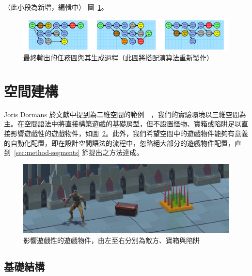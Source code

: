 （此小段為新增，編輯中）
圖~\ref{fig:final-mission-graph}。

\begin{figure}[!htb]
  \begin{center}
    \includegraphics[width=1.0\textwidth]{figures/final-mission-graph.png}
    \caption{最終輸出的任務圖與其生成過程（此圖將搭配演算法重新製作）}
    \label{fig:final-mission-graph}
  \end{center}
\end{figure}

\clearpage

\section{空間建構}
\label{sec:method-spacepieces}

Joris Dormans 於文獻中提到為二維空間的範例~\cite{dormans2010adventures}~\cite{dormans2012engineering}，我們的實驗環境以三維空間為主。在空間語法中將直接構築遊戲的基礎房型，但不設置怪物、寶箱或陷阱足以直接影響遊戲性的遊戲物件，如圖~\ref{fig:gameobject-list}。此外，我們希望空間中的遊戲物件能夠有意義的自動化配置，即在設計空間語法的流程中，忽略絕大部分的遊戲物件配置，直到~\ref{sec:method-segments} 節提出之方法達成。

\begin{figure}[!htb]
  \begin{center}
    \includegraphics[width=1.0\textwidth]{figures/gameobject-list.png}
    \caption{影響遊戲性的遊戲物件，由左至右分別為敵方、寶箱與陷阱} 
    \label{fig:gameobject-list}
  \end{center}
\end{figure}

\subsection{基礎結構}
\label{ssec:method-spacepieces-basic}

